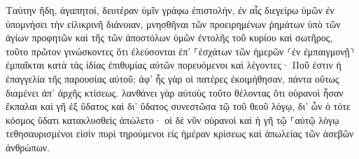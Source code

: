 \documentclass{openreader}
\begin{document}
Ταύτην ἤδη, ἀγαπητοί, δευτέραν ὑμῖν γράφω ἐπιστολήν, ἐν αἷς διεγείρω ὑμῶν ἐν ὑπομνήσει τὴν εἰλικρινῆ διάνοιαν, 
μνησθῆναι τῶν προειρημένων ῥημάτων ὑπὸ τῶν ἁγίων προφητῶν καὶ τῆς τῶν ἀποστόλων ὑμῶν ἐντολῆς τοῦ κυρίου καὶ σωτῆρος, 
τοῦτο πρῶτον γινώσκοντες ὅτι ἐλεύσονται ἐπ’ ⸀ἐσχάτων τῶν ἡμερῶν ⸂ἐν ἐμπαιγμονῇ⸃ ἐμπαῖκται κατὰ τὰς ἰδίας ἐπιθυμίας αὐτῶν πορευόμενοι 
καὶ λέγοντες· Ποῦ ἐστιν ἡ ἐπαγγελία τῆς παρουσίας αὐτοῦ; ἀφ’ ἧς γὰρ οἱ πατέρες ἐκοιμήθησαν, πάντα οὕτως διαμένει ἀπ’ ἀρχῆς κτίσεως. 
λανθάνει γὰρ αὐτοὺς τοῦτο θέλοντας ὅτι οὐρανοὶ ἦσαν ἔκπαλαι καὶ γῆ ἐξ ὕδατος καὶ δι’ ὕδατος συνεστῶσα τῷ τοῦ θεοῦ λόγῳ, 
δι’ ὧν ὁ τότε κόσμος ὕδατι κατακλυσθεὶς ἀπώλετο· 
οἱ δὲ νῦν οὐρανοὶ καὶ ἡ γῆ τῷ ⸀αὐτῷ λόγῳ τεθησαυρισμένοι εἰσὶν πυρὶ τηρούμενοι εἰς ἡμέραν κρίσεως καὶ ἀπωλείας τῶν ἀσεβῶν ἀνθρώπων. 
\end{document}
